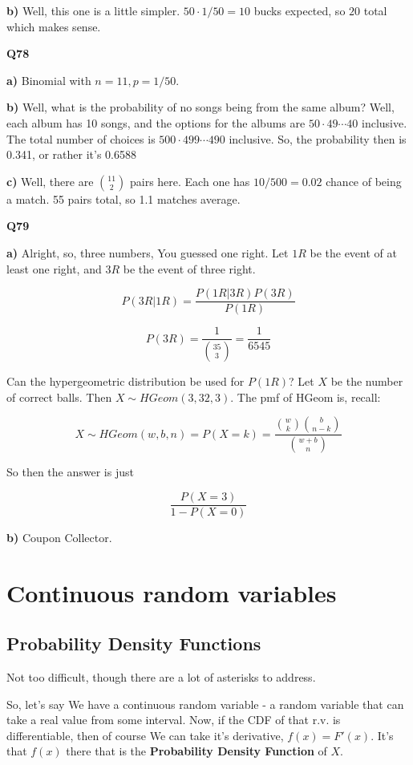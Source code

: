 \documentclass{article}
\begin{document}
		\textbf{b)} Well, this one is a little simpler. $50\cdot 1/50 = 10$ bucks expected, so $20$ total which makes sense.
		
		\hfill
		
		\textbf{Q78} 
		
		\textbf{a)} Binomial with $n=11, p=1/50$.
		
		\textbf{b)} Well, what is the probability of no songs being from  the same album? Well, each album has 10 songs, and the options for the albums are $50\cdot 49\cdots 40$ inclusive. The total number of choices is $500\cdot 499\cdots 490$ inclusive. So, the probability then is 0.341, or rather it's 0.6588
		
		\textbf{c)} Well, there are ${11\choose 2}$ pairs here. Each one has $10/500 = 0.02$ chance of being a match. 55 pairs total, so 1.1 matches average. 
		
		\hfill
		
		\textbf{Q79}
		
		\textbf{a)} Alright, so, three numbers, You guessed one right. Let $1R$ be the event of at least one right, and $3R$ be the event of three right.
		
		\[ P(3R\vert 1R) = \frac{P(1R\vert 3R)P(3R)}{P(1R)} \]
		
		\[ P(3R) = \frac{1}{{35\choose 3}} = \frac{1}{6545} \]
		
		Can the hypergeometric distribution be used for $P(1R)$? Let $X$ be the number of correct balls. Then $X\sim HGeom(3, 32, 3)$. The pmf of HGeom is, recall:
		
		\[ X\sim HGeom(w, b, n) = P(X=k) =  \frac{{w \choose k}{b\choose n-k}}{{w+b\choose n}} \]
		
		So then the answer is just
		
		\[ \frac{P(X=3)}{1-P(X=0)} \]
		
		\textbf{b)} Coupon Collector.
		
\newpage
\section{Continuous random variables}		
		
	\subsection{Probability Density Functions}
		
		Not too difficult, though there are a lot of asterisks to address.
		
		So, let's say We have a continuous random variable - a random variable that can take a real value from some interval. Now, if the CDF of that r.v. is differentiable, then of course We can take it's derivative, $f(x) = F'(x)$. It's that $f(x)$ there that is the \textbf{Probability Density Function} of $X$.
		
\end{document}
